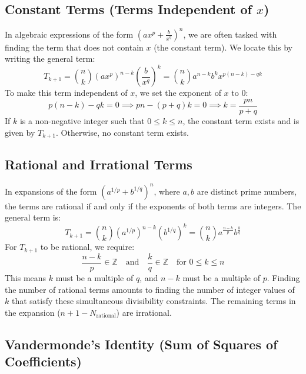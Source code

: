 \documentclass[10pt,journal,compsoc,onecolumn]{IEEEtran}
\begin{document}
\subsection{Constant Terms (Terms Independent of $x$)}

In algebraic expressions of the form $(ax^p + \frac{b}{x^q})^n$, we are often tasked with finding the term that does not contain $x$ (the constant term). We locate this by writing the general term:
\begin{equation}
T_{k+1} = \binom{n}{k} (ax^p)^{n-k} \left(\frac{b}{x^q}\right)^k = \binom{n}{k} a^{n-k} b^k x^{p(n-k) - qk}
\end{equation}
To make this term independent of $x$, we set the exponent of $x$ to $0$:
\begin{equation}
p(n-k) - qk = 0 \implies pn - (p+q)k = 0 \implies k = \frac{pn}{p+q}
\end{equation}
If $k$ is a non-negative integer such that $0 \le k \le n$, the constant term exists and is given by $T_{k+1}$. Otherwise, no constant term exists.

\subsection{Rational and Irrational Terms}

In expansions of the form $(a^{1/p} + b^{1/q})^n$, where $a, b$ are distinct prime numbers, the terms are rational if and only if the exponents of both terms are integers. The general term is:
\begin{equation}
T_{k+1} = \binom{n}{k} (a^{1/p})^{n-k} (b^{1/q})^k = \binom{n}{k} a^{\frac{n-k}{p}} b^{\frac{k}{q}}
\end{equation}
For $T_{k+1}$ to be rational, we require:
\begin{equation}
\frac{n-k}{p} \in \mathbb{Z} \quad \text{and} \quad \frac{k}{q} \in \mathbb{Z} \quad \text{for } 0 \le k \le n
\end{equation}
This means $k$ must be a multiple of $q$, and $n-k$ must be a multiple of $p$. Finding the number of rational terms amounts to finding the number of integer values of $k$ that satisfy these simultaneous divisibility constraints. The remaining terms in the expansion ($n + 1 - N_{\text{rational}}$) are irrational.

\subsection{Vandermonde's Identity (Sum of Squares of Coefficients)}
\end{document}
